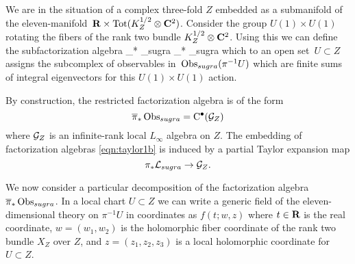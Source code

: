 
\parsec[]

We are in the situation of a complex three-fold $Z$ embedded as a submanifold of the eleven-manifold~$\mathbf{R} \times \text{Tot}(K_{Z}^{1/2} \otimes \mathbf{C}^2)$. 
Consider the group $U(1) \times U(1)$ rotating the fibers of the rank two bundle $K_Z^{1/2} \otimes \mathbf{C}^2$. 
Using this we can define the subfactorization algebra 
\beqn\label{eqn:taylor1b}
\Bar{\pi}_* \Obs_{sugra} \subset \pi_* \Obs_{sugra}
\eeqn
which to an open set~$U \subset Z$ assigns the subcomplex of observables in~$\operatorname{Obs}_{sugra} (\pi^{-1} U)$ which are finite sums of integral eigenvectors for this $U(1) \times U(1)$ action.

By construction, the restricted factorization algebra is of the form
\[
\overline{\pi}_*\operatorname{Obs}_{sugra} = {\rm C}^\bullet(\mathcal G_Z) 
\]
where $\mathcal G_Z$ is an infinite-rank local $L_\infty$ algebra on $Z$. 
The embedding of factorization algebras \eqref{eqn:taylor1b} is induced by a partial Taylor expansion map
\[
\pi_* \mathcal L_{sugra} \to \mathcal G_Z .
\]

\parsec[s:cstarfive]

We now consider a particular decomposition of the factorization algebra $\overline{\pi}_* \operatorname{Obs}_{sugra}$. 
In a local chart $U \subset Z$ we can write a generic field of the eleven-dimensional theory on $\pi^{-1} U$ in coordinates as $f(t;w,z)$ where $t \in \mathbf{R}$ is the real coordinate, $w=(w_1,w_2)$ is the holomorphic fiber coordinate of the rank two bundle $X_Z$ over $Z$, and $z = (z_1,z_2,z_3)$ is a local holomorphic coordinate for $U \subset Z$. 

